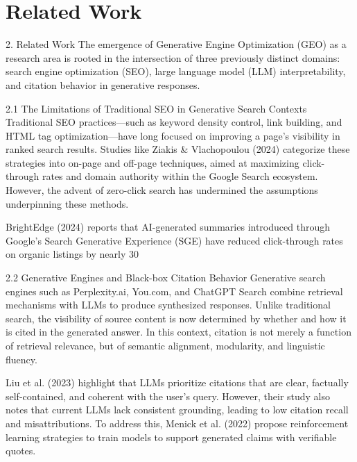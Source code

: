 \section{Related Work}

2. Related Work
The emergence of Generative Engine Optimization (GEO) as a research area is rooted in the intersection of three previously distinct domains: search engine optimization (SEO), large language model (LLM) interpretability, and citation behavior in generative responses.

2.1 The Limitations of Traditional SEO in Generative Search Contexts
Traditional SEO practices—such as keyword density control, link building, and HTML tag optimization—have long focused on improving a page’s visibility in ranked search results. Studies like Ziakis & Vlachopoulou (2024) categorize these strategies into on-page and off-page techniques, aimed at maximizing click-through rates and domain authority within the Google Search ecosystem. However, the advent of zero-click search has undermined the assumptions underpinning these methods.

BrightEdge (2024) reports that AI-generated summaries introduced through Google’s Search Generative Experience (SGE) have reduced click-through rates on organic listings by nearly 30%

2.2 Generative Engines and Black-box Citation Behavior
Generative search engines such as Perplexity.ai, You.com, and ChatGPT Search combine retrieval mechanisms with LLMs to produce synthesized responses. Unlike traditional search, the visibility of source content is now determined by whether and how it is cited in the generated answer. In this context, citation is not merely a function of retrieval relevance, but of semantic alignment, modularity, and linguistic fluency.

Liu et al. (2023) highlight that LLMs prioritize citations that are clear, factually self-contained, and coherent with the user’s query. However, their study also notes that current LLMs lack consistent grounding, leading to low citation recall and misattributions. To address this, Menick et al. (2022) propose reinforcement learning strategies to train models to support generated claims with verifiable quotes.

